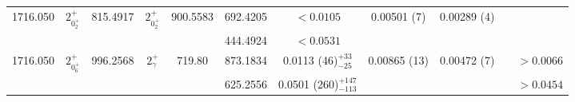 \begin{landscape}
\begin{longtable}{>{\footnotesize}c|>{\footnotesize}c|>{\footnotesize}c|>{\footnotesize}c|>{\footnotesize}c|>{\footnotesize}c|>{\footnotesize}c|>{\footnotesize}c|>{\footnotesize}c|>{\footnotesize}c|>{\footnotesize}c}
        1716.050 & $2^+_{0^+_2}$ & 815.4917 & $2^+_{0^+_2}$ & 900.5583 &  692.4205 & $<0.0105$ & 0.00501 (7) & 0.00289 (4) & &  \\
        & & &  & & 444.4924 & $<0.0531$ & & &  & \\ \hline
        1716.050 & $2^+_{0^+_6}$ & 996.2568 & $2^+_{\gamma}$ & 719.80 & 873.1834 & 0.0113 (46)$^{+33}_{-25}$ & 0.00865 (13) & 0.00472 (7) & & $>0.0066$\\
        &  & &  &  & 625.2556 & 0.0501 (260)$^{+147}_{-113}$ & & &  & $>0.0454$\\ 
        \bottomrule
    \end{longtable}
\end{landscape}